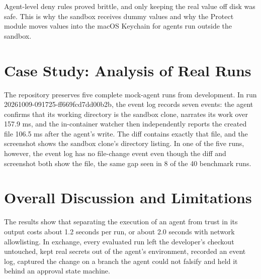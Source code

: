 \documentclass[12pt,a4paper,oneside]{report}
\begin{document}
Agent-level deny rules proved brittle, and only keeping the real value off disk was safe. This is why the sandbox receives dummy values and why the Protect module moves values into the macOS Keychain for agents run outside the sandbox.

\section{Case Study: Analysis of Real Runs}\label{case-study-analysis-of-real-runs}

The repository preserves five complete mock-agent runs from development. In run 20261009-091725-ff669fcd7dd00b2b, the event log records seven events: the agent confirms that its working directory is the sandbox clone, narrates its work over 157.9 ms, and the in-container watcher then independently reports the created file 106.5 ms after the agent's write. The diff contains exactly that file, and the screenshot shows the sandbox clone's directory listing. In one of the five runs, however, the event log has no file-change event even though the diff and screenshot both show the file, the same gap seen in 8 of the 40 benchmark runs.

\section{Overall Discussion and Limitations}\label{discussion-and-limitations}

The results show that separating the execution of an agent from trust in its output costs about 1.2 seconds per run, or about 2.0 seconds with network allowlisting. In exchange, every evaluated run left the developer's checkout untouched, kept real secrets out of the agent's environment, recorded an event log, captured the change on a branch the agent could not falsify and held it behind an approval state machine.

\begingroup\small
\end{document}
